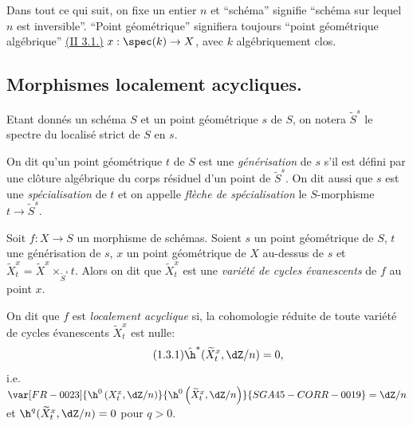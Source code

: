 Dans tout ce qui suit, on fixe un entier $n$ et ``schéma'' signifie ``schéma 
sur lequel $n$ est inversible''. ``Point géométrique'' signifiera toujours 
``point géométrique algébrique'' \hyperref[I:2-3-1]{(II 3.1.)} $x:\spec(k)\to X$, avec $k$ 
algébriquement clos. 










\subsection{Morphismes localement acycliques.}\label{I:5-1}





\begin{sourceexampledotdash}[Notation]\label{I:5-1-1}
Etant donnés un schéma $S$ et un point géométrique $s$ de $S$, on 
notera $\widetilde S^s$ le spectre du localisé strict de $S$ en $s$. 
\end{sourceexampledotdash}





\begin{definitiondotdash}\label{I:5-1-2}
On dit qu'un point géométrique $t$ de $S$ est une \emph{générisation} de 
$s$ s'il est défini par une clôture algébrique du corps résiduel d'un 
point de $\widetilde S^s$. On dit aussi que $s$ est une \emph{spécialisation} 
de $t$ et on appelle \emph{flèche de spécialisation} le $S$-morphisme 
$t\to \widetilde S^s$. 
\end{definitiondotdash}





\begin{definitiondotdash}\label{I:5-1-3}
Soit $f:X\to S$ un morphisme de schémas. Soient $s$ un point géométrique de 
$S$, $t$ une générisation de $s$, $x$ un point géométrique de $X$ 
au-dessus de $s$ et 
$\widetilde X_t^x = \widetilde X^x\times_{\widetilde S^s} t$. Alors on dit que 
$\widetilde X_t^x$ est une \emph{variété de cycles évanescents} de $f$ au 
point $x$. 

On dit que $f$ est \emph{localement acyclique} si, la cohomologie réduite de 
toute variété de cycles évanescents $\widetilde X_t^x$ est nulle:
\begingroup
\makeatletter
\tagsleft@true
\let\veqno\@@leqno
\makeatother
\begin{equation*}\tag{1.3.1}\label{I:eq:5-1-3-1}
  \hat\h^*(\widetilde X_t^x,\dZ/n) = 0\text{,}
\end{equation*}
\endgroup
i.e. $\var[FR-0023]{\h^0\left(X_t^x,\dZ/n\right)}{\h^0\left(\widetilde X_t^x,\dZ/n\right)}{SGA45-CORR-0019} = \dZ/n$ et 
$\h^q(\widetilde X_t^x,\dZ/n) = 0$ pour $q>0$. 
\end{definitiondotdash}





